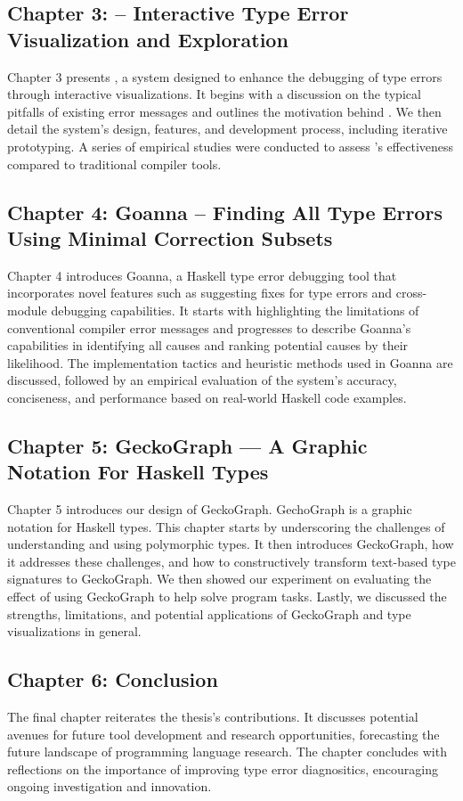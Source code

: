 \subsection{Chapter 3: \chameleon{} -- Interactive Type Error Visualization and Exploration}
Chapter 3 presents \chameleon{}, a system designed to enhance the debugging of type errors through interactive visualizations. It begins with a discussion on the typical pitfalls of existing error messages and outlines the motivation behind \chameleon{}. We then detail the system's design, features, and development process, including iterative prototyping. A series of empirical studies were conducted to assess \chameleon{}'s effectiveness compared to traditional compiler tools.
    
\subsection{Chapter 4: Goanna -- Finding All Type Errors Using Minimal Correction Subsets}
Chapter 4 introduces Goanna, a Haskell type error debugging tool that incorporates novel features such as suggesting fixes for type errors and cross-module debugging capabilities. It starts with highlighting the limitations of conventional compiler error messages and progresses to describe Goanna's capabilities in identifying all causes and ranking potential causes by their likelihood. The implementation tactics and heuristic methods used in Goanna are discussed, followed by an empirical evaluation of the system's accuracy, conciseness, and performance based on real-world Haskell code examples.
    
\subsection{Chapter 5: GeckoGraph — A Graphic Notation For Haskell Types}
Chapter 5 introduces our design of GeckoGraph. GechoGraph is a graphic notation for Haskell types. This chapter starts by underscoring the challenges of understanding and using polymorphic types. It then introduces GeckoGraph, how it addresses these challenges, and how to constructively transform text-based type signatures to GeckoGraph. We then showed our experiment on evaluating the effect of using GeckoGraph to help solve program tasks. Lastly, we discussed the strengths, limitations, and potential applications of GeckoGraph and type visualizations in general.   
    
\subsection{Chapter 6: Conclusion}
The final chapter reiterates the thesis's contributions. It discusses potential avenues for future tool development and research opportunities, forecasting the future landscape of programming language research. The chapter concludes with reflections on the importance of improving type error diagnositics, encouraging ongoing investigation and innovation.